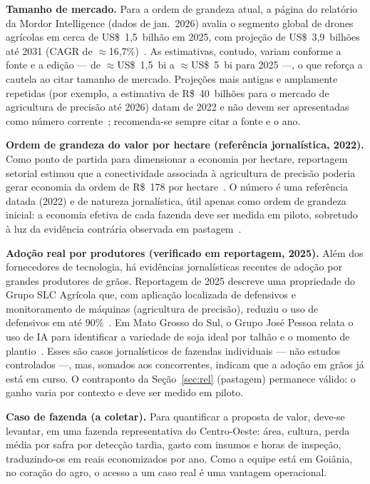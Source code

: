 \documentclass[conference]{IEEEtran}
\newcommand{\rs}{R\$}
\begin{document}
\textbf{Tamanho de mercado.} Para a ordem de grandeza atual, a página do relatório da Mordor Intelligence (dados de jan.\ 2026) avalia o segmento global de drones agrícolas em cerca de US\$~1,5~bilhão em 2025, com projeção de US\$~3,9~bilhões até 2031 (CAGR de $\approx$16,7\%)~\cite{mordor_drones}. As estimativas, contudo, variam conforme a fonte e a edição --- de $\approx$US\$~1,5~bi a $\approx$US\$~5~bi para 2025 ---, o que reforça a cautela ao citar tamanho de mercado. Projeções mais antigas e amplamente repetidas (por exemplo, a estimativa de \rs~40~bilhões para o mercado de agricultura de precisão até 2026) datam de 2022 e não devem ser apresentadas como número corrente~\cite{maissoja_mercado}; recomenda-se sempre citar a fonte e o ano.

\textbf{Ordem de grandeza do valor por hectare (referência jornalística, 2022).} Como ponto de partida para dimensionar a economia por hectare, reportagem setorial estimou que a conectividade associada à agricultura de precisão poderia gerar economia da ordem de \rs~178 por hectare~\cite{canalrural_178}. O número é uma referência datada (2022) e de natureza jornalística, útil apenas como ordem de grandeza inicial: a economia efetiva de cada fazenda deve ser medida em piloto, sobretudo à luz da evidência contrária observada em pastagem~\cite{silva_maccari}.

\textbf{Adoção real por produtores (verificado em reportagem, 2025).} Além dos fornecedores de tecnologia, há evidências jornalísticas recentes de adoção por grandes produtores de grãos. Reportagem de 2025 descreve uma propriedade do Grupo SLC Agrícola que, com aplicação localizada de defensivos e monitoramento de máquinas (agricultura de precisão), reduziu o uso de defensivos em até 90\%~\cite{slc_planetacampo}. Em Mato Grosso do Sul, o Grupo José Pessoa relata o uso de IA para identificar a variedade de soja ideal por talhão e o momento de plantio~\cite{josepessoa_canalrural}. Esses são casos jornalísticos de fazendas individuais --- não estudos controlados ---, mas, somados aos concorrentes, indicam que a adoção em grãos já está em curso. O contraponto da Seção~\ref{sec:rel} (pastagem) permanece válido: o ganho varia por contexto e deve ser medido em piloto.

\textbf{Caso de fazenda (a coletar).} Para quantificar a proposta de valor, deve-se levantar, em uma fazenda representativa do Centro-Oeste: área, cultura, perda média por safra por detecção tardia, gasto com insumos e horas de inspeção, traduzindo-os em reais economizados por ano. Como a equipe está em Goiânia, no coração do agro, o acesso a um caso real é uma vantagem operacional.
\end{document}
